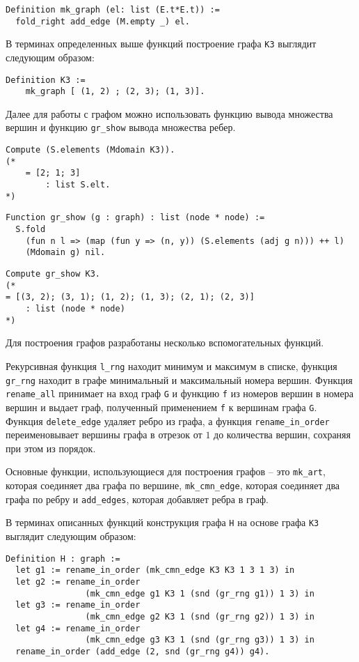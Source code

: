 \begin{verbatim}
Definition mk_graph (el: list (E.t*E.t)) :=
  fold_right add_edge (M.empty _) el.
\end{verbatim}

В терминах определенных выше функций построение графа {\tt K3} выглядит следующим образом:
\begin{verbatim}
Definition K3 := 
    mk_graph [ (1, 2) ; (2, 3); (1, 3)].
\end{verbatim}

Далее для работы с графом можно использовать функцию вывода множества вершин и функцию {\tt gr\_show} вывода множества ребер.
\begin{verbatim}
Compute (S.elements (Mdomain K3)).
(* 
    = [2; 1; 3]
        : list S.elt.
*)
\end{verbatim}

\begin{verbatim}
Function gr_show (g : graph) : list (node * node) :=
  S.fold 
    (fun n l => (map (fun y => (n, y)) (S.elements (adj g n))) ++ l) 
    (Mdomain g) nil.
\end{verbatim}

\begin{verbatim}
Compute gr_show K3.
(*
= [(3, 2); (3, 1); (1, 2); (1, 3); (2, 1); (2, 3)]
    : list (node * node)
*)
\end{verbatim}

Для построения графов разработаны несколько вспомогательных функций.

Рекурсивная функция {\tt l\_rng} находит минимум и максимум в списке, функция {\tt gr\_rng} находит в графе минимальный и максимальный номера вершин. Функция {\tt rename\_all} принимает на вход граф {\tt G} и функцию {\tt f} из номеров вершин в номера вершин и выдает граф, полученный применением {\tt f} к вершинам графа {\tt G}. Функция {\tt delete\_edge} удаляет ребро из графа, а функция {\tt rename\_in\_order} переименовывает вершины графа в отрезок от $1$ до количества вершин, сохраняя при этом из порядок.

Основные функции, использующиеся для построения графов -- это {\tt mk\_art}, которая соединяет два графа по вершине, {\tt mk\_cmn\_edge}, которая соединяет два графа по ребру и {\tt add\_edges}, которая добавляет ребра в граф.

В терминах описанных функций конструкция графа {\tt H} на основе графа {\tt K3} выглядит следующим образом:

\begin{verbatim}
Definition H : graph := 
  let g1 := rename_in_order (mk_cmn_edge K3 K3 1 3 1 3) in
  let g2 := rename_in_order 
                (mk_cmn_edge g1 K3 1 (snd (gr_rng g1)) 1 3) in
  let g3 := rename_in_order 
                (mk_cmn_edge g2 K3 1 (snd (gr_rng g2)) 1 3) in
  let g4 := rename_in_order 
                (mk_cmn_edge g3 K3 1 (snd (gr_rng g3)) 1 3) in
  rename_in_order (add_edge (2, snd (gr_rng g4)) g4).
\end{verbatim}

